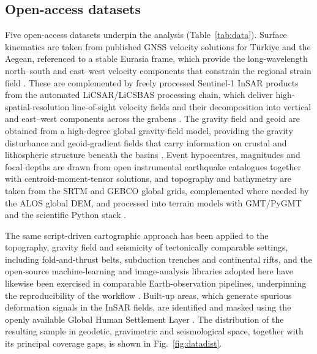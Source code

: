 \documentclass[pdflatex,sn-mathphys-num]{sn-jnl}%
\theoremstyle{thmstyleone}%
\theoremstyle{thmstyletwo}%
\theoremstyle{thmstylethree}%
\begin{document}
\subsection{Open-access datasets}\label{sec:data}
Five open-access datasets underpin the analysis (Table~\ref{tab:data}). Surface
kinematics are taken from published GNSS velocity solutions for T\"{u}rkiye and the
Aegean, referenced to a stable Eurasia frame, which provide the long-wavelength
north--south and east--west velocity components that constrain the regional strain
field \cite{Kurt2023,England2016,Nocquet2012}. These are complemented by
freely processed Sentinel-1 InSAR products from the automated LiCSAR/LiCSBAS
processing chain, which deliver high-spatial-resolution line-of-sight velocity fields
and their decomposition into vertical and east--west components across the grabens
\cite{Lazecky2020,Morishita2020,Berardino2002,Ferretti2001,Goldstein1988,Rosen2000,Weiss2020}. The gravity field and geoid are obtained
from a high-degree global gravity-field model, providing the gravity disturbance and
geoid-gradient fields that carry information on crustal and lithospheric structure
beneath the basins \cite{Pavlis2012,Foerste2014,Lemenkova202216,Ince2019,Hirt2013,Tapley2004,Sandwell2014}.
Event hypocentres, magnitudes and focal depths are drawn from open instrumental
earthquake catalogues together with centroid-moment-tensor solutions, and topography
and bathymetry are taken from the SRTM and GEBCO global grids, complemented where
needed by the ALOS global DEM, and processed into terrain models with GMT/PyGMT and
the scientific Python stack
\cite{Storchak2013,Ekstrom2012,Farr2007,GEBCO2023,Tadono2014,Wessel2019}.

The same script-driven cartographic approach has been applied to the topography,
gravity field and seismicity of tectonically comparable settings, including
fold-and-thrust belts, subduction trenches and continental rifts, and the open-source
machine-learning and image-analysis libraries adopted here have likewise been
exercised in comparable Earth-observation pipelines, underpinning the reproducibility
of the workflow
\cite{Wessel2019,Sandwell2014,Lemenkova202316,Harris2020,Pedregosa2011,Lemenkova202301,Farr2007,Virtanen2020}.
Built-up areas, which generate spurious deformation signals in the InSAR fields, are
identified and masked using the openly available Global Human Settlement Layer
\cite{Pesaresi2023,Imamoglu2022,Diercks2024}. The distribution of the resulting sample
in geodetic, gravimetric and seismological space, together with its principal coverage
gaps, is shown in Fig.~\ref{fig:datadist}.
\end{document}
